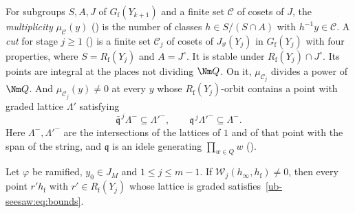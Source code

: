 For subgroups $S,A,J$ of $G_{\mathrm f}(Y_{k+1})$ and a finite set $\mathcal C$
of cosets of $J$, the \emph{multiplicity} $\mu_{\mathcal C}(y)$ () is the
number of classes $h\in S/(S\cap A)$ with $h^{-1}y\in \mathcal C$. A \emph{cut} for stage $j\ge1$
() is a finite set $\mathcal C_j$ of cosets of $J_\vartheta(Y_j)$ in
$G_{\mathrm f}(Y_j)$ with four properties, where $S=R_{\mathrm f}(Y_j)$ and $A=J^\circ$. It is stable under
$R_{\mathrm f}(Y_j)\cap J^\circ$. Its points are integral at the places not dividing $\Nm Q$. On it,
$\mu_{\mathcal C_j}$ divides a power of $\Nm Q$. And $\mu_{\mathcal C_j}(y)\neq0$ at every $y$ whose
$R_{\mathrm f}(Y_j)$-orbit contains a point with graded lattice $\Lambda'$ satisfying
\begin{equation}\label{ub-seesaw:eq:bounds}
  \bar{\mathfrak q}^{\,j}\Lambda^-\subseteq\Lambda'^-,\qquad \mathfrak q^{\,j}\Lambda'^-\subseteq\Lambda^- .
\end{equation}
Here $\Lambda^-,\Lambda'^-$ are the intersections of the lattices of $1$ and of that point with the
span of the string, and $\mathfrak q$ is an idele generating $\prod_{w\in Q}w$
().

\begin{lemma}\label{ub-seesaw:lem:support}
Let $\varphi$ be ramified, $y_0\in J_M$ and $1\le j\le m-1$. If $\mathcal W_j(h_\infty,h_{\mathrm f})\neq0$, then every
point $r'h_{\mathrm f}$ with $r'\in R_{\mathrm f}(Y_j)$ whose lattice is graded satisfies~\eqref{ub-seesaw:eq:bounds}.
\end{lemma}

